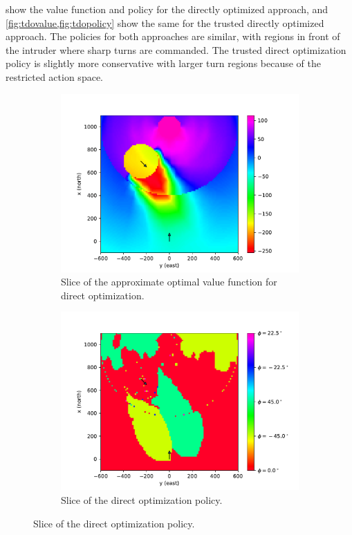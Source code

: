  show the value function and policy for the directly optimized approach, and \cref{fig:tdovalue,fig:tdopolicy} show the same for the trusted directly optimized approach.
The policies for both approaches are similar, with regions in front of the intruder where sharp turns are commanded.
The trusted direct optimization policy is slightly more conservative with larger turn regions because of the restricted action space.

\begin{figure}[p]
    \centering
    \begin{subfigure}[t]{0.48\textwidth}
        \includegraphics[width=\textwidth]{media/dovalue.pdf}
        \caption{Slice of the approximate optimal value function for direct optimization.}
        \label{fig:dovalue}
    \end{subfigure}
    \hfill
    \begin{subfigure}[t]{0.48\textwidth}
        \includegraphics[width=\columnwidth]{media/dopolicy.pdf}
        \caption{Slice of the direct optimization policy.}
        \label{fig:dopolicy}
    \end{subfigure}


\end{figure}
